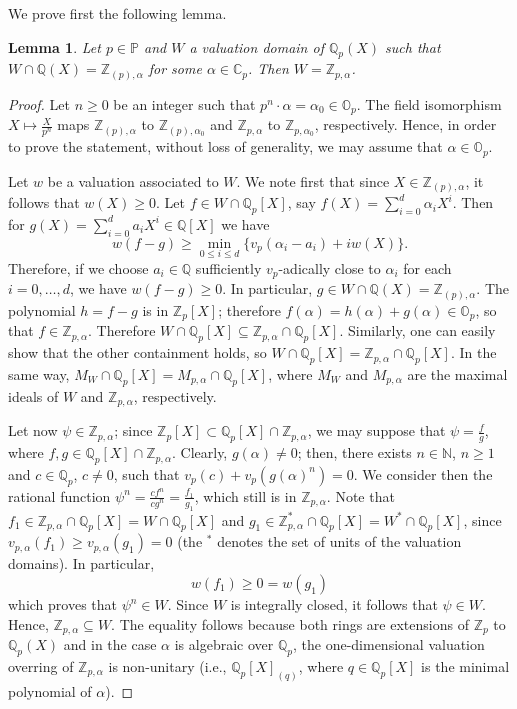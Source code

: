 \documentclass[10pt]{article}
\numberwithin{equation}{section}
\newtheorem{Lem}[equation]{Lemma}
\theoremstyle{definition}\newtheorem{Def}[equation]{Definition}
\theoremstyle{definition}\newtheorem{Ques}[equation]{Question}
\newcommand{\Q}{\mathbb{Q}}
\newcommand{\N}{\mathbb{N}}
\newcommand{\Z}{\mathbb{Z}}
\renewcommand{\O}{\mathbb{O}}
\newcommand{\C}{\mathbb{C}}
\newcommand{\PP}{\mathbb{P}}
\begin{document}
We prove first the following lemma.

\begin{Lem}\label{extension Vpa to completion}
Let $p\in\PP$ and $W$ a valuation domain of $\Q_p(X)$ such that  $W\cap \Q(X)=\Z_{(p),\alpha}$ for some $\alpha\in \C_p$. Then $W=\Z_{p,\alpha}$.
\end{Lem}
\begin{proof}
Let $n\geq0$ be an integer such that $p^n\cdot \alpha=\alpha_0\in\O_p$. The field isomorphism $X\mapsto\frac{X}{p^n}$ maps $\Z_{(p),\alpha}$ to $\Z_{(p),\alpha_0}$ and $\Z_{p,\alpha}$ to $\Z_{p,\alpha_0}$, respectively. Hence, in order to prove the statement, without loss of generality, we may assume  that $\alpha\in \O_p$.

Let $w$ be a valuation associated to $W$. We note first that since $X\in  \Z_{(p),\alpha}$, it follows that $w(X)\geq0$. Let $f\in W\cap\Q_p[X]$, say $f(X)=\sum_{i=0}^d \alpha_i X^i$. Then for $g(X)=\sum_{i=0}^d a_i X^i\in\Q[X]$ we have
$$w(f-g)\geq\min_{0\leq i\leq d}\{v_p(\alpha_i-a_i)+iw(X)\}.$$ 
Therefore, if we choose $a_i\in\Q$ sufficiently $v_p$-adically close to $\alpha_i$ for each $i=0,\ldots,d$, we have $w(f-g)\geq0$. In particular, $g\in W\cap \Q(X)=\Z_{(p),\alpha}$. The polynomial $h=f-g$ is in $\Z_p[X]$; therefore $f(\alpha)=h(\alpha)+g(\alpha)\in\O_p$, so that $f\in \Z_{p,\alpha}$. Therefore $W\cap \Q_p[X]\subseteq \Z_{p,\alpha}\cap\Q_p[X]$. Similarly, one can easily show that the other containment holds, so $W\cap \Q_p[X]=\Z_{p,\alpha}\cap\Q_p[X]$.  In the same way, $M_W\cap \Q_p[X]=M_{p,\alpha}\cap\Q_p[X]$, where $M_W$ and $M_{p,\alpha}$ are the maximal ideals of $W$ and $\Z_{p,\alpha}$, respectively.

Let now $\psi\in\Z_{p,\alpha}$; since $\Z_p[X]\subset \Q_p[X]\cap \Z_{p,\alpha}$, we may suppose that $\psi=\frac{f}{g}$, where $f,g\in\Q_p[X]\cap \Z_{p,\alpha}$. Clearly, $g(\alpha)\not=0$; then, there exists $n\in\N$, $n\geq 1$ and $c\in\Q_p$, $c\not=0$, such that $v_p(c)+v_p(g(\alpha)^n)=0$. We consider then the rational function $\psi^n=\frac{cf^n}{cg^n}=\frac{f_1}{g_1}$, which still is in $\Z_{p,\alpha}$. Note that $f_1\in \Z_{p,\alpha}\cap\Q_p[X]=W\cap\Q_p[X]$ and $g_1\in \Z_{p,\alpha}^*\cap\Q_p[X]=W^*\cap \Q_p[X]$, since $v_{p,\alpha}(f_1)\geq v_{p,\alpha}(g_1)=0$ (the ${}^*$ denotes the set of units of the valuation domains). In particular, 
$$w(f_1)\geq0=w(g_1)$$
which proves that $\psi^n\in W$. Since $W$ is integrally closed, it follows that $\psi\in W$. 
Hence, $\Z_{p,\alpha}\subseteq W$. The equality follows because both rings are extensions of $\Z_p$ to $\Q_p(X)$ and in the case $\alpha$ is algebraic over $\Q_p$, the one-dimensional valuation overring of $\Z_{p,\alpha}$ is non-unitary (i.e., $\Q_p[X]_{(q)}$, where $q\in\Q_p[X]$ is the minimal polynomial of $\alpha$).
\end{proof}
\end{document}
